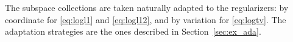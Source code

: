 The subspace collections are taken naturally adapted to the regularizers: by coordinate for \eqref{eq:logl1} and \eqref{eq:logl12}, and by variation for \eqref{eq:logtv}. {The adaptation strategies are the ones described in Section~\ref{sec:ex_ada}.}






